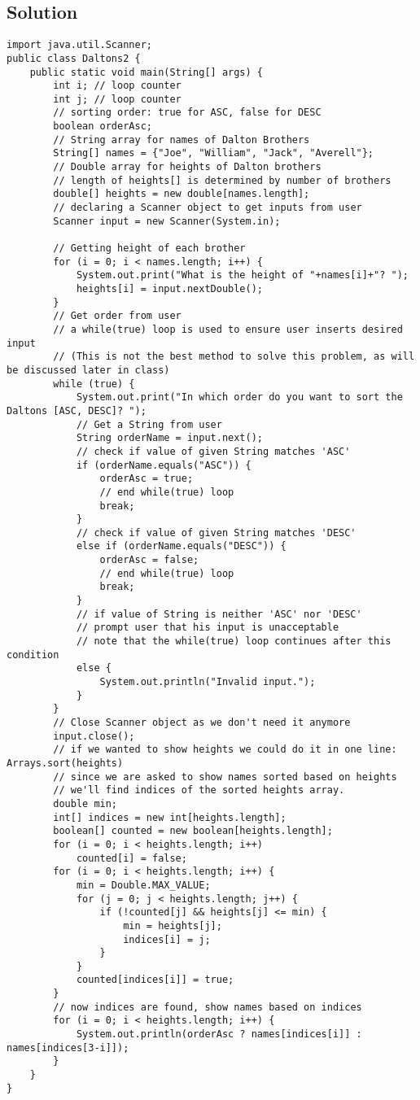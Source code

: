 \subsection*{Solution}
\begin{lstlisting}
import java.util.Scanner;
public class Daltons2 {
	public static void main(String[] args) {
		int i; // loop counter
		int j; // loop counter
		// sorting order: true for ASC, false for DESC
		boolean orderAsc;
		// String array for names of Dalton Brothers
		String[] names = {"Joe", "William", "Jack", "Averell"};
		// Double array for heights of Dalton brothers
		// length of heights[] is determined by number of brothers
		double[] heights = new double[names.length];
		// declaring a Scanner object to get inputs from user
		Scanner input = new Scanner(System.in);

		// Getting height of each brother
		for (i = 0; i < names.length; i++) {
			System.out.print("What is the height of "+names[i]+"? ");
			heights[i] = input.nextDouble();
		}
		// Get order from user
		// a while(true) loop is used to ensure user inserts desired input
		// (This is not the best method to solve this problem, as will be discussed later in class)
		while (true) {
			System.out.print("In which order do you want to sort the Daltons [ASC, DESC]? ");
			// Get a String from user
			String orderName = input.next();
			// check if value of given String matches 'ASC'
			if (orderName.equals("ASC")) {
				orderAsc = true;
				// end while(true) loop
				break;
			}
			// check if value of given String matches 'DESC'
			else if (orderName.equals("DESC")) {
				orderAsc = false;
				// end while(true) loop
				break;
			}
			// if value of String is neither 'ASC' nor 'DESC'
			// prompt user that his input is unacceptable
			// note that the while(true) loop continues after this condition
			else {
				System.out.println("Invalid input.");
			}
		}
		// Close Scanner object as we don't need it anymore
		input.close();
		// if we wanted to show heights we could do it in one line: Arrays.sort(heights)
		// since we are asked to show names sorted based on heights
		// we'll find indices of the sorted heights array.
		double min;
		int[] indices = new int[heights.length];
		boolean[] counted = new boolean[heights.length];
		for (i = 0; i < heights.length; i++)
			counted[i] = false;
		for (i = 0; i < heights.length; i++) {
			min = Double.MAX_VALUE;
			for (j = 0; j < heights.length; j++) {
				if (!counted[j] && heights[j] <= min) {
					min = heights[j];
					indices[i] = j;
				}
			}
			counted[indices[i]] = true;
		}
		// now indices are found, show names based on indices
		for (i = 0; i < heights.length; i++) {
			System.out.println(orderAsc ? names[indices[i]] : names[indices[3-i]]);
		}
	}
}
\end{lstlisting}

